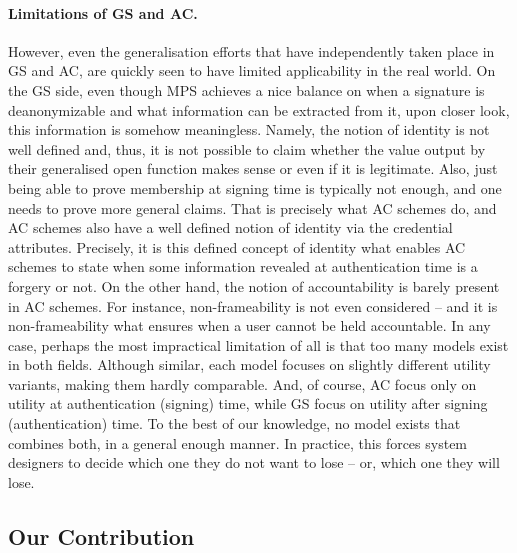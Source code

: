 \paragraph{Limitations of GS and AC.} %
However, even the generalisation efforts that have independently taken place in
GS and AC, are quickly seen to have limited applicability in the real world.
On the GS side, even though MPS achieves a nice balance on when a signature is
deanonymizable and what information can be extracted from it, upon closer look,
this information is somehow meaningless. Namely, the notion of identity is not
well defined and, thus, it is not possible to claim whether the value output by
their generalised open function makes sense or even if it is legitimate. Also,
just being able to prove membership at signing time is typically not enough, and
one needs to prove more general claims. That is precisely what AC schemes do,
and AC schemes also have a well defined notion of identity via the credential
attributes. Precisely, it is this defined concept of identity what enables AC
schemes to state when some information revealed at authentication time is a
forgery or not. On the other hand, the notion of accountability  is barely
present in AC schemes. For instance, non-frameability is not even considered
-- and it is non-frameability what ensures when a user cannot be held
accountable.
%
In any case, perhaps the most impractical limitation of all is that too many
models exist in both fields. Although similar, each model focuses on slightly
different utility variants, making them hardly comparable. And, of course, AC
focus only on utility at authentication (signing) time, while GS focus on
utility after signing (authentication) time. To the best of our knowledge, no
model exists that combines both, in a general enough manner. In practice, this
forces system designers to decide which one they do not want to lose -- or,
which one they will lose.


\subsection{Our Contribution} 

